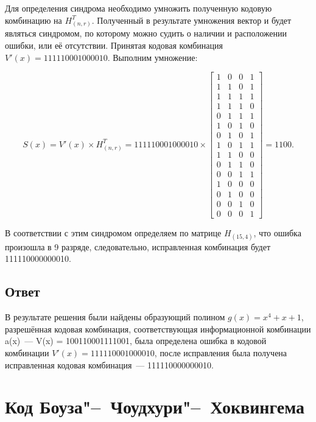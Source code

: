 Для определения синдрома необходимо умножить полученную кодовую
комбинацию на $H^T_{(n, r)}$. Полученный в результате умножения вектор
и будет являться синдромом, по которому можно судить о наличии и
расположении ошибки, или её отсутствии. Принятая кодовая комбинация
$V'(x) = 111110001000010$. Выполним умножение:

\begin{equation*}
  S(x) = V'(x) \times H^T_{(n, r)} = 111110001000010 \times
  \left[
    \begin{array}{cccc}
      1 & 0 & 0 & 1 \\
      1 & 1 & 0 & 1 \\
      1 & 1 & 1 & 1 \\
      1 & 1 & 1 & 0 \\
      0 & 1 & 1 & 1 \\
      1 & 0 & 1 & 0 \\
      0 & 1 & 0 & 1 \\
      1 & 0 & 1 & 1 \\
      1 & 1 & 0 & 0 \\
      0 & 1 & 1 & 0 \\
      0 & 0 & 1 & 1 \\
      1 & 0 & 0 & 0 \\
      0 & 1 & 0 & 0 \\
      0 & 0 & 1 & 0 \\
      0 & 0 & 0 & 1 
    \end{array}
  \right] = 1100.
\end{equation*}

В соответствии с этим синдромом определяем по матрице $H_{(15,4)}$,
что ошибка произошла в 9 разряде, следовательно, исправленная
комбинация будет 111110000000010.

\subsection{Ответ}

В результате решения были найдены образующий полином $g(x) = x^4 + x
+1$, разрешённая кодовая комбинация, соответствующая информационной
комбинации a(x)~--- V(x) = 100110001111001, была определена ошибка в
кодовой комбинации $V'(x) = 111110001000010$, после исправления была
получена исправленная кодовая комбинация~--- 111110000000010.
\newpage

\section{Код Боуза"--~Чоудхури"--~Хоквингема}
\label{sec:BCH}

